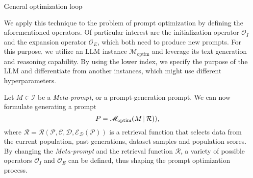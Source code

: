 \begin{algorithm}
    \caption{General optimization loop}
    \label{alg:genoptimloop}
     
         
    \end{algorithm}
    
We apply this technique to the problem of prompt optimization by defining the aforementioned operators.
Of particular interest are the initialization operator $\mathscr{O}_I$ and the expansion operator $\mathscr{O}_E$, which
both need to produce new prompts. For this purpose, we utilize an LLM instance $\mathscr{M}_{\text{optim}}$ and leverage its 
text generation and reasoning capability. By using the lower index, we specify the purpose of the LLM and differentiate 
from another instances, which might use different hyperparameters.

Let $M\in\mathcal{I}$ be a \textit{Meta-prompt}, or a prompt-generation prompt. We can now formulate generating a prompt 
\begin{equation}
    \label{eq:metaprompting}
    P = \mathscr{M}_{\text{optim}}(M\, \vert \, \mathcal{R})),
\end{equation}
where $\mathcal{R} = \mathcal{R}(\mathcal{P}, \mathcal{C}, \mathcal{D}, \mathcal{E}_{\mathcal{D}}(\mathcal{P}))$ is a retrieval function that selects data
from the current population, past generations, dataset samples and population scores. 
By changing the \textit{Meta-prompt} and the retrieval function $\mathcal{R}$, a variety of possible operators $\mathscr{O}_I$ and $\mathscr{O}_E$
can be defined, thus shaping the prompt optimization process.  

